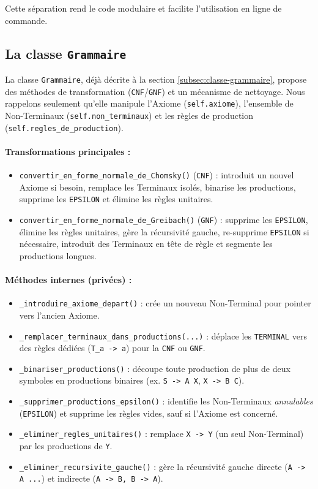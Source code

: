 \documentclass[a4paper,12pt]{article}
\begin{document}
\noindent
Cette séparation rend le code modulaire et facilite l’utilisation en ligne de commande.

\subsection{La classe \texttt{Grammaire}}
\label{subsec:classe-grammaire-detail}

La classe \texttt{Grammaire}, déjà décrite à la section \ref{subsec:classe-grammaire}, propose des méthodes de transformation (\texttt{CNF}/\texttt{GNF}) et un mécanisme de nettoyage. Nous rappelons seulement qu’elle manipule l’Axiome (\texttt{self.axiome}), l’ensemble de Non-Terminaux (\texttt{self.non\_terminaux}) et les règles de production (\texttt{self.regles\_de\_production}). 

\paragraph{Transformations principales :}
\begin{itemize}
    \item \texttt{convertir\_en\_forme\_normale\_de\_Chomsky()} (\texttt{CNF}) : introduit un nouvel Axiome si besoin, remplace les Terminaux isolés, binarise les productions, supprime les \texttt{EPSILON} et élimine les règles unitaires.
    \item \texttt{convertir\_en\_forme\_normale\_de\_Greibach()} (\texttt{GNF}) : supprime les \texttt{EPSILON}, élimine les règles unitaires, gère la récursivité gauche, re-supprime \texttt{EPSILON} si nécessaire, introduit des Terminaux en tête de règle et segmente les productions longues.
\end{itemize}

\paragraph{Méthodes internes (privées) :}
\begin{itemize}
    \item \texttt{\_introduire\_axiome\_depart()} : crée un nouveau Non-Terminal pour pointer vers l’ancien Axiome.
    \item \texttt{\_remplacer\_terminaux\_dans\_productions(...)} : déplace les \texttt{TERMINAL} vers des règles dédiées (\texttt{T\_a -> a}) pour la \texttt{CNF} ou \texttt{GNF}.
    \item \texttt{\_binariser\_productions()} : découpe toute production de plus de deux symboles en productions binaires (ex. \texttt{S -> A X}, \texttt{X -> B C}).
    \item \texttt{\_supprimer\_productions\_epsilon()} : identifie les Non-Terminaux \emph{annulables} (\texttt{EPSILON}) et supprime les règles vides, sauf si l’Axiome est concerné.
    \item \texttt{\_eliminer\_regles\_unitaires()} : remplace \texttt{X -> Y} (un seul Non-Terminal) par les productions de \texttt{Y}.
    \item \texttt{\_eliminer\_recursivite\_gauche()} : gère la récursivité gauche directe (\texttt{A -> A ...}) et indirecte (\texttt{A -> B, B -> A}).
\end{itemize}
\end{document}
